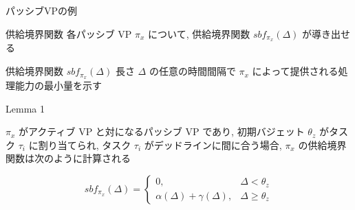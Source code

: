 \begin{frame}{パッシブVPの例}
\end{frame}


\begin{frame}{供給境界関数}
    各パッシブ VP $\pi_{x}$ について, 供給境界関数 $s b f_{\pi_{x}}(\Delta)$ が導き出せる
    \begin{block}{供給境界関数 $s b f_{\pi_{x}}(\Delta)$}
        長さ $\Delta$ の任意の時間間隔で $\pi_{x}$ によって提供される処理能力の最小量を示す
    \end{block}
\end{frame}

\begin{frame}[label=lemma3]{Lemma 1}
    \begin{lemma}[]
        $\pi_{x}$ がアクティブ VP と対になるパッシブ VP であり, 初期バジェット $\theta_{z}$ がタスク $\tau_{i}$ に割り当てられ, タスク $\tau_{i}$ がデッドラインに間に合う場合, $\pi_{x}$ の供給境界関数は次のように計算される

        \begin{equation*}
            s b f_{\pi_{x}}(\Delta)= \begin{cases}0, & \Delta<\theta_{z} \\ \alpha(\Delta)+\gamma(\Delta), & \Delta \geq \theta_{z}\end{cases}
        \end{equation*}
    \end{lemma}
\end{frame}

